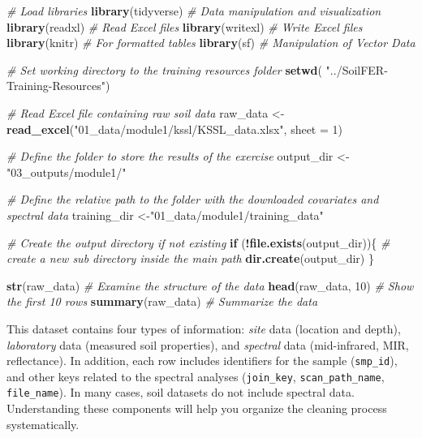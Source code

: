 \documentclass[
  10pt,
  b5paper,
  oneside]{book}
\newenvironment{Shaded}{\begin{snugshade}}{\end{snugshade}}
\newcommand{\AttributeTok}[1]{\textcolor[rgb]{0.13,0.29,0.53}{#1}}
\newcommand{\CommentTok}[1]{\textcolor[rgb]{0.56,0.35,0.01}{\textit{#1}}}
\newcommand{\ControlFlowTok}[1]{\textcolor[rgb]{0.13,0.29,0.53}{\textbf{#1}}}
\newcommand{\DecValTok}[1]{\textcolor[rgb]{0.00,0.00,0.81}{#1}}
\newcommand{\FunctionTok}[1]{\textcolor[rgb]{0.13,0.29,0.53}{\textbf{#1}}}
\newcommand{\NormalTok}[1]{#1}
\newcommand{\OtherTok}[1]{\textcolor[rgb]{0.56,0.35,0.01}{#1}}
\newcommand{\SpecialCharTok}[1]{\textcolor[rgb]{0.81,0.36,0.00}{\textbf{#1}}}
\newcommand{\StringTok}[1]{\textcolor[rgb]{0.31,0.60,0.02}{#1}}
\begin{document}
\begin{Shaded}
\begin{Highlighting}[]
\CommentTok{\# Load libraries}
\FunctionTok{library}\NormalTok{(tidyverse)        }\CommentTok{\# Data manipulation and visualization}
\FunctionTok{library}\NormalTok{(readxl)           }\CommentTok{\# Read Excel files}
\FunctionTok{library}\NormalTok{(writexl)          }\CommentTok{\# Write Excel files}
\FunctionTok{library}\NormalTok{(knitr)            }\CommentTok{\# For formatted tables}
\FunctionTok{library}\NormalTok{(sf)               }\CommentTok{\# Manipulation of Vector Data}

\CommentTok{\# Set working directory to the training resources folder}
\FunctionTok{setwd}\NormalTok{( }\StringTok{"../SoilFER{-}Training{-}Resources"}\NormalTok{)}

\CommentTok{\# Read Excel file containing raw soil data}
\NormalTok{raw\_data }\OtherTok{\textless{}{-}} \FunctionTok{read\_excel}\NormalTok{(}\StringTok{"01\_data/module1/kssl/KSSL\_data.xlsx"}\NormalTok{, }\AttributeTok{sheet =} \DecValTok{1}\NormalTok{) }

\CommentTok{\# Define the folder to store the results of the exercise}
\NormalTok{output\_dir }\OtherTok{\textless{}{-}}\StringTok{"03\_outputs/module1/"}

\CommentTok{\# Define the relative path to the folder with the downloaded covariates and spectral data}
\NormalTok{training\_dir }\OtherTok{\textless{}{-}}\StringTok{"01\_data/module1/training\_data"}

\CommentTok{\# Create the output directory if not existing}
\ControlFlowTok{if}\NormalTok{ (}\SpecialCharTok{!}\FunctionTok{file.exists}\NormalTok{(output\_dir))\{}
  \CommentTok{\# create a new sub directory inside the main path}
  \FunctionTok{dir.create}\NormalTok{(output\_dir)}
\NormalTok{\}}

\FunctionTok{str}\NormalTok{(raw\_data) }\CommentTok{\# Examine the structure of the data}
\FunctionTok{head}\NormalTok{(raw\_data, }\DecValTok{10}\NormalTok{) }\CommentTok{\# Show the first 10 rows}
\FunctionTok{summary}\NormalTok{(raw\_data) }\CommentTok{\# Summarize the data}
\end{Highlighting}
\end{Shaded}

This dataset contains four types of information: \emph{site} data (location and depth), \emph{laboratory} data (measured soil properties), and \emph{spectral} data (mid-infrared, MIR, reflectance). In addition, each row includes identifiers for the sample (\texttt{smp\_id}), and other keys related to the spectral analyses (\texttt{join\_key}, \texttt{scan\_path\_name}, \texttt{file\_name}). In many cases, soil datasets do not include spectral data. Understanding these components will help you organize the cleaning process systematically.
\end{document}
